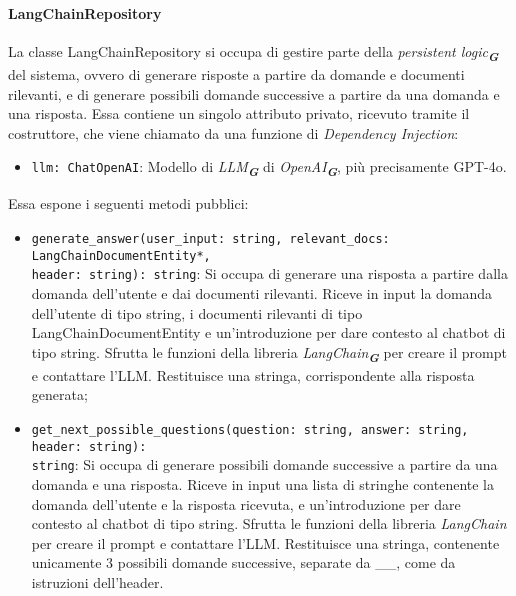 \paragraph{LangChainRepository}
\label{sec:langchain_repository}
La classe LangChainRepository si occupa di gestire parte della \emph{persistent logic}\textsubscript{\textbf{\textit{G}}} del sistema, ovvero di generare risposte a partire da domande e documenti rilevanti, e di generare possibili domande successive a partire da una domanda e una risposta. Essa contiene un singolo attributo privato, ricevuto tramite il costruttore, che viene chiamato da una funzione di \emph{Dependency Injection}:
\begin{itemize}
    \item \texttt{llm: ChatOpenAI}: Modello di \emph{LLM}\textsubscript{\textbf{\textit{G}}} di \emph{OpenAI}\textsubscript{\textbf{\textit{G}}}, più precisamente GPT-4o.
\end{itemize}
Essa espone i seguenti metodi pubblici:
\begin{itemize}
    \item \texttt{generate\_answer(user\_input: string, relevant\_docs: LangChainDocumentEntity*,\\ header: string): string}: Si occupa di generare una risposta a partire dalla domanda dell'utente e dai documenti rilevanti. Riceve in input la domanda dell'utente di tipo string, i documenti rilevanti di tipo LangChainDocumentEntity e un'introduzione per dare contesto al chatbot di tipo string. Sfrutta le funzioni della libreria \emph{LangChain}\textsubscript{\textbf{\textit{G}}} per creare il prompt e contattare l'LLM. Restituisce una stringa, corrispondente alla risposta generata;
    \item \texttt{get\_next\_possible\_questions(question: string, answer: string, header: string):\\ string}: Si occupa di generare possibili domande successive a partire da una domanda e una risposta. Riceve in input una lista di stringhe contenente la domanda dell'utente e la risposta ricevuta, e un'introduzione per dare contesto al chatbot di tipo string. Sfrutta le funzioni della libreria \emph{LangChain} per creare il prompt e contattare l'LLM. Restituisce una stringa, contenente unicamente 3 possibili domande successive, separate da \_\_, come da istruzioni dell'header.
\end{itemize}

